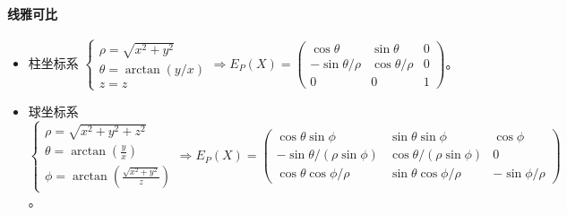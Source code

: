\documentclass[
12pt, %
a4paper, 
oneside, %
headinclude,footinclude, %
]{scrartcl}
\begin{document}
\paragraph{线雅可比}
\begin{itemize}
\item 柱坐标系
$
\begin{cases}
\rho = \sqrt{x^2 + y^2} \\
\theta = \arctan(y / x) \\
z = z
\end{cases}
\Rightarrow
E_P(X) =
\begin{pmatrix}
\cos\theta & \sin\theta & 0 \\
-\sin\theta / \rho & \cos\theta / \rho & 0 \\
0 & 0 & 1
\end{pmatrix}
$。
\item 球坐标系
$
\begin{cases}
\rho = \sqrt{x^2 + y^2 + z^2} \\
\theta = \arctan(\frac{y}{x}) \\
\phi = \arctan(\frac{\sqrt{x^2 + y^2}}{z})
\end{cases}
\Rightarrow
E_P(X) =
\begin{pmatrix}
\cos\theta \sin\phi & \sin\theta \sin\phi & \cos\phi \\
-\sin\theta / (\rho \sin\phi) & \cos\theta / (\rho \sin\phi) & 0 \\
\cos\theta \cos\phi / \rho & \sin\theta \cos\phi / \rho & -\sin\phi / \rho
\end{pmatrix}
$。
\end{itemize} 
\end{document}

